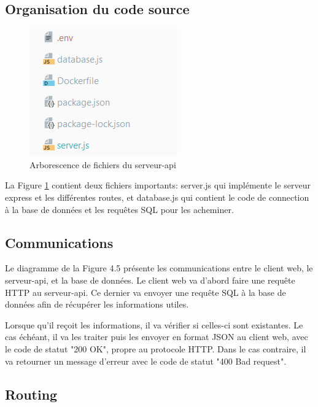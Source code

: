 \documentclass[
    iai, %
    il, %
]{heig-tb}
\begin{document}
\subsection{Organisation du code source}

\begin{figure}[h]
    \centering
    \includegraphics[scale=0.9]{backend_source_code.png}
    \caption{Arborescence de fichiers du serveur-api}
    \label{fig:backend_source_files}
\end{figure}

La Figure \ref{fig:backend_source_files} contient deux fichiers importants: server.js qui implémente le serveur \gls{express} et les différentes routes,
et database.js qui contient le code de connection à la base de données et les requêtes SQL pour les acheminer.

\subsection{Communications}


Le diagramme de la Figure 4.5 présente les communications entre le client web,
le serveur-api, et la base de données. Le client web va d'abord faire une requête HTTP au serveur-api.
Ce dernier va envoyer une requête SQL à la base de données afin de récupérer les informations utiles.

Lorsque qu'il reçoit les informations, il va vérifier si celles-ci sont existantes.
Le cas échéant, il va les traiter puis les envoyer en format JSON au client web, avec le code de statut "200 OK", propre au protocole HTTP.
Dans le cas contraire, il va retourner un message d'erreur avec le code de statut "400 Bad request".

\subsection{Routing}
\end{document}
